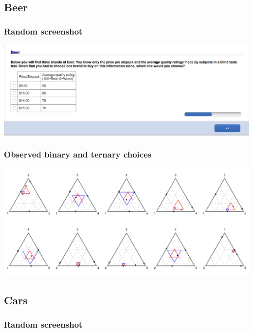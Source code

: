 \documentclass[11pt,letter]{article}
\begin{document}
\pagebreak

\subsection*{Beer}



\subsubsection*{Random screenshot}

\includegraphics[width=15cm]{Population_study_design/screenshot_Beer.png}

\subsubsection*{Observed binary and ternary choices}

\includegraphics[width=15cm]{./Population_study_data/Simplexes/Beer.pdf}

\pagebreak

\subsection*{Cars}



\subsubsection*{Random screenshot}
\end{document}
